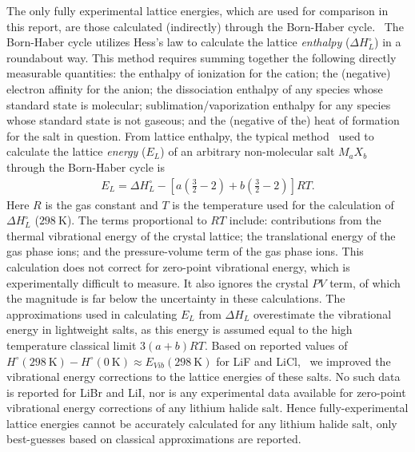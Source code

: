 \documentclass[titlepage,11pt]{article}
\begin{document}
The only fully experimental lattice energies, which are used for comparison in this report, are those calculated (indirectly) through the Born-Haber cycle.~\cite{book:CRC,Jenkins2005,ladd1959calculation} The Born-Haber cycle utilizes Hess's law to calculate the lattice \textit{enthalpy} ($\Delta H^{\circ}_{L}$) in a roundabout way. This method requires summing together the following directly measurable quantities: the enthalpy of ionization for the cation; the (negative) electron affinity for the anion; the dissociation enthalpy of any species whose standard state is molecular; sublimation/vaporization enthalpy for any species whose standard state is not gaseous; and the (negative of the) heat of formation for the salt in question. From lattice enthalpy, the typical method~\cite{book:CRC,Jenkins2005} used to calculate the lattice \textit{energy} ($E_{L}$) of an arbitrary non-molecular salt $M_{a}X_{b}$ through the Born-Haber cycle is
\begin{align}
E_{L} =\Delta H^{\circ}_{L} - \left[ a \left( \frac { 3 } { 2 } - 2 \right) + b \left( \frac { 3 } { 2 } - 2 \right) \right] R T.
\end{align}
Here $R$ is the gas constant and $T$ is the temperature used for the calculation of $\Delta H^{\circ}_{L}$ ($\SI{298}{\kelvin}$). The terms proportional to $RT$ include: contributions from the thermal vibrational energy of the crystal lattice; the translational energy of the gas phase ions; and the pressure-volume term of the gas phase ions. This calculation does not correct for zero-point vibrational energy, which is experimentally difficult to measure. It also ignores the crystal $PV$ term, of which the magnitude is far below the uncertainty in these calculations. The approximations used in calculating $E_{L}$ from $\Delta H_{L}$ overestimate the vibrational energy in lightweight salts, as this energy is assumed equal to the high temperature classical limit $3(a+b)RT$. Based on reported values of $H^{\circ} (\SI{298}{\kelvin}) - H^{\circ}(\SI{0}{\kelvin}) \approx E_{Vib} (\SI{298}{\kelvin})$ for LiF and LiCl,~\cite{chase1998nist} we improved the vibrational energy corrections to the lattice energies of these salts. No such data is reported for LiBr and LiI, nor is any experimental data available for zero-point vibrational energy corrections of any lithium halide salt. Hence fully-experimental lattice energies cannot be accurately calculated for any lithium halide salt, only best-guesses based on classical approximations are reported.~\cite{book:CRC} 
\end{document}
